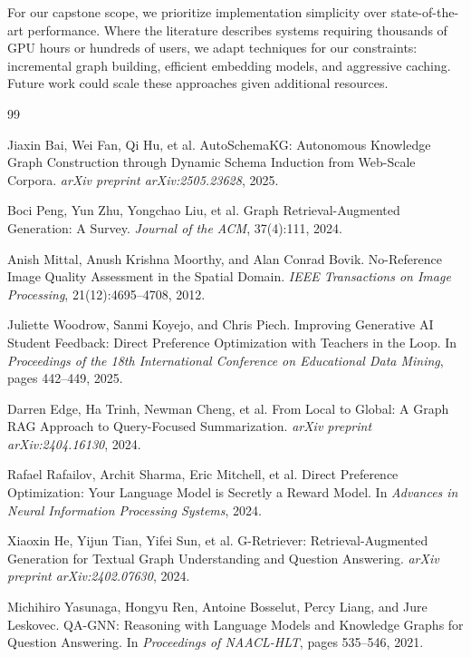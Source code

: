 \documentclass[11pt, twocolumn]{article}
\begin{document}
For our capstone scope, we prioritize implementation simplicity over state-of-the-art performance. Where the literature describes systems requiring thousands of GPU hours or hundreds of users, we adapt techniques for our constraints: incremental graph building, efficient embedding models, and aggressive caching. Future work could scale these approaches given additional resources.


\begin{thebibliography}{99}

Jiaxin Bai, Wei Fan, Qi Hu, et al.
\newblock AutoSchemaKG: Autonomous Knowledge Graph Construction through Dynamic Schema Induction from Web-Scale Corpora.
\newblock \emph{arXiv preprint arXiv:2505.23628}, 2025.

Boci Peng, Yun Zhu, Yongchao Liu, et al.
\newblock Graph Retrieval-Augmented Generation: A Survey.
\newblock \emph{Journal of the ACM}, 37(4):111, 2024.

Anish Mittal, Anush Krishna Moorthy, and Alan Conrad Bovik.
\newblock No-Reference Image Quality Assessment in the Spatial Domain.
\newblock \emph{IEEE Transactions on Image Processing}, 21(12):4695--4708, 2012.

Juliette Woodrow, Sanmi Koyejo, and Chris Piech.
\newblock Improving Generative AI Student Feedback: Direct Preference Optimization with Teachers in the Loop.
\newblock In \emph{Proceedings of the 18th International Conference on Educational Data Mining}, pages 442--449, 2025.

Darren Edge, Ha Trinh, Newman Cheng, et al.
\newblock From Local to Global: A Graph RAG Approach to Query-Focused Summarization.
\newblock \emph{arXiv preprint arXiv:2404.16130}, 2024.

Rafael Rafailov, Archit Sharma, Eric Mitchell, et al.
\newblock Direct Preference Optimization: Your Language Model is Secretly a Reward Model.
\newblock In \emph{Advances in Neural Information Processing Systems}, 2024.

Xiaoxin He, Yijun Tian, Yifei Sun, et al.
\newblock G-Retriever: Retrieval-Augmented Generation for Textual Graph Understanding and Question Answering.
\newblock \emph{arXiv preprint arXiv:2402.07630}, 2024.

Michihiro Yasunaga, Hongyu Ren, Antoine Bosselut, Percy Liang, and Jure Leskovec.
\newblock QA-GNN: Reasoning with Language Models and Knowledge Graphs for Question Answering.
\newblock In \emph{Proceedings of NAACL-HLT}, pages 535--546, 2021.


\end{thebibliography}
\end{document}
